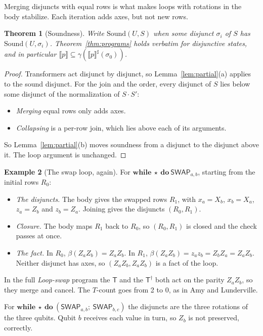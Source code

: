 \documentclass[11pt]{article}
\newtheorem{theorem}{Theorem}[section]
\theoremstyle{definition}
\newtheorem{example}[theorem]{Example}
\theoremstyle{remark}
\newcommand{\sem}[1]{\llbracket #1 \rrbracket}
\newcommand{\abs}[1]{\llbracket #1 \rrbracket^{\sharp}}
\newcommand{\adj}{^{\dagger}}
\newcommand{\gam}{\gamma}
\newcommand{\back}{\beta}
\newcommand{\gate}[1]{\mathsf{#1}}
\begin{document}
Merging disjuncts with equal rows is what makes loops with rotations in the body
stabilize. Each iteration adds axes, but not new rows.

\begin{theorem}[Soundness]\label{thm:disj}
Write $\mathrm{Sound}(U, S)$ when some disjunct $\sigma_i$ of $S$ has
$\mathrm{Sound}(U, \sigma_i)$. Theorem~\ref{thm:programs} holds verbatim for disjunctive
states, and in particular $\sem{p} \subseteq \gam(\abs{p}(\sigma_0))$.
\end{theorem}

\begin{proof}
Transformers act disjunct by disjunct, so Lemma~\ref{lem:partial}(a) applies to the sound
disjunct. For the join and the order, every disjunct of $S$ lies below some disjunct of the
normalization of $S \cdot S'$:
\begin{itemize}[nosep]
  \item \emph{Merging} equal rows only adds axes.
  \item \emph{Collapsing} is a per-row join, which lies above each of its arguments.
\end{itemize}
So Lemma~\ref{lem:partial}(b) moves soundness from a disjunct to the disjunct above it. The
loop argument is unchanged.
\end{proof}

\begin{example}[The swap loop, again]
For $\textbf{while}\ \star\ \textbf{do}\ \mathsf{SWAP}_{a,b}$, starting from the initial
rows $R_0$:
\begin{itemize}[nosep]
  \item \emph{The disjuncts.} The body gives the swapped rows $R_1$, with
  $x_a = X_b$, $x_b = X_a$, $z_a = Z_b$ and $z_b = Z_a$. Joining gives the disjuncts
  $(R_0, R_1)$.
  \item \emph{Closure.} The body maps $R_1$ back to $R_0$, so $(R_0, R_1)$ is closed and the
  check passes at once.
  \item \emph{The fact.} In $R_0$, $\back(Z_aZ_b) = Z_aZ_b$. In $R_1$,
  $\back(Z_aZ_b) = z_a z_b = Z_b Z_a = Z_aZ_b$. Neither disjunct has axes, so
  $(Z_aZ_b, Z_aZ_b)$ is a fact of the loop.
\end{itemize}
In the full \emph{Loop-swap} program the $\gate T$ and the $\gate T\adj$ both act on the
parity $Z_aZ_b$, so they merge and cancel. The $T$-count goes from 2 to 0, as in Amy and
Lunderville.

For $\textbf{while}\ \star\ \textbf{do}\ (\mathsf{SWAP}_{a,b};\ \mathsf{SWAP}_{b,c})$ the
disjuncts are the three rotations of the three qubits. Qubit $b$ receives each value in
turn, so $Z_b$ is not preserved, correctly.
\end{example}
\end{document}
